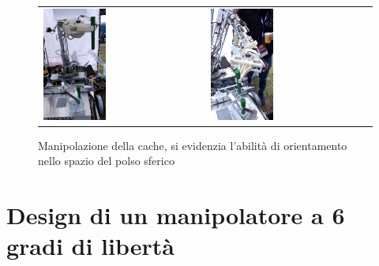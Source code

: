 \documentclass[%
corpo=11pt,
twoside,
 stile=classica,
oldstyle,
greek,%
]{toptesi}
\begin{document}
		\begin{figure}
			\centering
			\begin{tabular}{ll}
				\includegraphics[width=0.4\textwidth]{pictures/cache2.png}
				&
				\includegraphics[width=0.4\textwidth]{pictures/cache3.png}
			\end{tabular}
			\caption{Manipolazione della cache, si evidenzia l'abilità di orientamento nello spazio del polso sferico}
			\label{fig:cache}
		\end{figure}
		
	
\chapter{Design di un manipolatore a 6 gradi di libertà}
\end{document}
